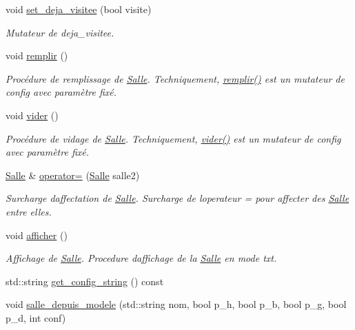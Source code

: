\begin{DoxyCompactItemize}
void \hyperlink{classSalle_a2c5dfa8f0e6b6c427203812d8d91524a}{set\+\_\+deja\+\_\+visitee} (bool visite)
\begin{DoxyCompactList}\small\item\em Mutateur de {\itshape deja\+\_\+visitee}. \end{DoxyCompactList}\item 
void \hyperlink{classSalle_ae6fd7211225455d887859f983e3bddce}{remplir} ()
\begin{DoxyCompactList}\small\item\em Procédure de remplissage de \hyperlink{classSalle}{Salle}. Techniquement, \hyperlink{classSalle_ae6fd7211225455d887859f983e3bddce}{remplir()} est un mutateur de {\itshape config} avec paramètre fixé. \end{DoxyCompactList}\item 
void \hyperlink{classSalle_ae8248a5ded8514be67a29efdeb70af96}{vider} ()
\begin{DoxyCompactList}\small\item\em Procédure de vidage de \hyperlink{classSalle}{Salle}. Techniquement, \hyperlink{classSalle_ae8248a5ded8514be67a29efdeb70af96}{vider()} est un mutateur de {\itshape config} avec paramètre fixé. \end{DoxyCompactList}\item 
\hyperlink{classSalle}{Salle} \& \hyperlink{classSalle_a315947e357a3fd958b40eb087a82c4d7}{operator=} (\hyperlink{classSalle}{Salle} salle2)
\begin{DoxyCompactList}\small\item\em Surcharge d\textquotesingle{}affectation de \hyperlink{classSalle}{Salle}. Surcharge de l\textquotesingle{}operateur = pour affecter des \hyperlink{classSalle}{Salle} entre elles. \end{DoxyCompactList}\item 
void \hyperlink{classSalle_a50ed839f1a93753fddf6171ef343a0bb}{afficher} ()
\begin{DoxyCompactList}\small\item\em Affichage de \hyperlink{classSalle}{Salle}. Procedure d\textquotesingle{}affichage de la \hyperlink{classSalle}{Salle} en mode txt. \end{DoxyCompactList}\item 
std\+::string \hyperlink{classSalle_ac8e706275a4d3545eb33a6f446a554a1}{get\+\_\+config\+\_\+string} () const 
\item 
void \hyperlink{classSalle_a6eaf8452709243464f7919b53bccc0b3}{salle\+\_\+depuis\+\_\+modele} (std\+::string nom, bool p\+\_\+h, bool p\+\_\+b, bool p\+\_\+g, bool p\+\_\+d, int conf)

\end{DoxyCompactItemize}

